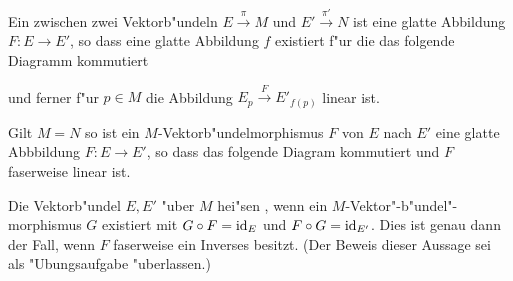 Ein  zwischen zwei Vektorb"undeln $E \xrightarrow{\pi} M$ und $E' \xrightarrow{\pi'} N$ ist eine glatte Abbildung $F \colon E \to E'$, so dass eine glatte Abbildung $f$ existiert f"ur die das folgende Diagramm kommutiert

\begin{center}\end{center}

und ferner f"ur $p \in M$ die Abbildung $E_p \xrightarrow{F} E'_{f(p)}$ linear ist.

Gilt $M = N$ so ist ein $M$-Vektorb"undelmorphismus $F$ von $E$ nach $E'$ eine glatte Abbbildung $F \colon E \to E'$, so dass das folgende Diagram kommutiert und $F$ faserweise linear ist.

\begin{center}\end{center}

Die Vektorb"undel $E,E'$ "uber $M$ hei"sen , wenn ein $M$-Vektor"-b"undel"-morphismus $G$ existiert mit $G \circ F = \operatorname{id}_E$ und $F \circ G = \operatorname{id}_{E'}$.
Dies ist genau dann der Fall, wenn $F$ faserweise ein Inverses besitzt.
(Der Beweis dieser Aussage sei als "Ubungsaufgabe "uberlassen.)

